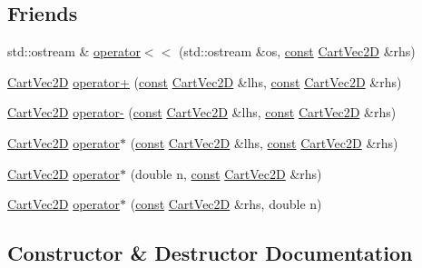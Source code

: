 \subsection*{Friends}
\begin{DoxyCompactItemize}
\item 
std\+::ostream \& \hyperlink{class_cart_vec2_d_a9b8a3e8f8c11b0b30560a2ecc6996eb0}{operator$<$$<$} (std\+::ostream \&os, \hyperlink{functions__c_8js_afacfd9c985d225bb07483b887a801b6f}{const} \hyperlink{class_cart_vec2_d}{Cart\+Vec2D} \&rhs)
\item 
\hyperlink{class_cart_vec2_d}{Cart\+Vec2D} \hyperlink{class_cart_vec2_d_a221f353e4cc614c6220d4b9362082e1d}{operator+} (\hyperlink{functions__c_8js_afacfd9c985d225bb07483b887a801b6f}{const} \hyperlink{class_cart_vec2_d}{Cart\+Vec2D} \&lhs, \hyperlink{functions__c_8js_afacfd9c985d225bb07483b887a801b6f}{const} \hyperlink{class_cart_vec2_d}{Cart\+Vec2D} \&rhs)
\item 
\hyperlink{class_cart_vec2_d}{Cart\+Vec2D} \hyperlink{class_cart_vec2_d_a596a5c2c5a21d5cb423b81b3434a508e}{operator-\/} (\hyperlink{functions__c_8js_afacfd9c985d225bb07483b887a801b6f}{const} \hyperlink{class_cart_vec2_d}{Cart\+Vec2D} \&lhs, \hyperlink{functions__c_8js_afacfd9c985d225bb07483b887a801b6f}{const} \hyperlink{class_cart_vec2_d}{Cart\+Vec2D} \&rhs)
\item 
\hyperlink{class_cart_vec2_d}{Cart\+Vec2D} \hyperlink{class_cart_vec2_d_a6eb8393d1dae60c826374b058caeac4c}{operator$\ast$} (\hyperlink{functions__c_8js_afacfd9c985d225bb07483b887a801b6f}{const} \hyperlink{class_cart_vec2_d}{Cart\+Vec2D} \&lhs, \hyperlink{functions__c_8js_afacfd9c985d225bb07483b887a801b6f}{const} \hyperlink{class_cart_vec2_d}{Cart\+Vec2D} \&rhs)
\item 
\hyperlink{class_cart_vec2_d}{Cart\+Vec2D} \hyperlink{class_cart_vec2_d_aaf50bea49ba3f5c0b50aa0151a78d464}{operator$\ast$} (double n, \hyperlink{functions__c_8js_afacfd9c985d225bb07483b887a801b6f}{const} \hyperlink{class_cart_vec2_d}{Cart\+Vec2D} \&rhs)
\item 
\hyperlink{class_cart_vec2_d}{Cart\+Vec2D} \hyperlink{class_cart_vec2_d_a5b2381590093015b51800138fe859ec7}{operator$\ast$} (\hyperlink{functions__c_8js_afacfd9c985d225bb07483b887a801b6f}{const} \hyperlink{class_cart_vec2_d}{Cart\+Vec2D} \&rhs, double n)
\end{DoxyCompactItemize}


\subsection{Constructor \& Destructor Documentation}
